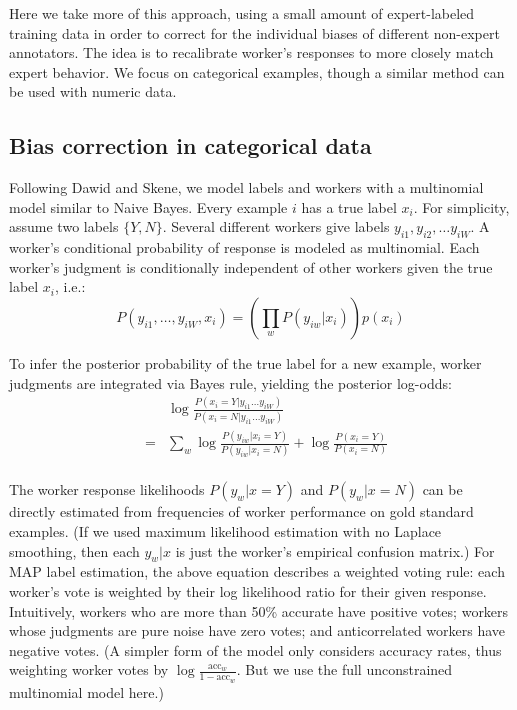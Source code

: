 \documentclass[11pt]{article}
\begin{document}
Here we take more of this approach, using a small amount of expert-labeled training data in order to correct for the individual biases of different non-expert annotators.  The idea is to recalibrate worker's responses to more closely match expert behavior.  We focus on categorical examples, though a similar method can be used with numeric data.
\vspace*{-0.1in}
\subsection{ Bias correction in categorical data }

Following Dawid and Skene, we model labels and workers with a multinomial model similar to Naive Bayes.
Every example $i$ has a true label $x_i$.  For simplicity, assume two labels $\{Y,N\}$.   Several different workers give labels $y_{i1}, y_{i2}, \ldots y_{iW}$.  A worker's conditional probability of response is modeled as multinomial.  Each worker's judgment is conditionally independent of other workers given the true label $x_i$, i.e.:
\[ P(y_{i1}, \ldots, y_{iW}, x_i) = \left( \prod_{w} P(y_{iw} | x_i) \right) p(x_i) \]

To infer the posterior probability of the true label for a new example, worker judgments are integrated via Bayes rule, yielding the posterior log-odds:
\begin{eqnarray*}
&& \log \frac{P(x_i = Y  | y_{i1} \ldots y_{iW}) }{ P(x_i=N | y_{i1} \ldots y_{iW})  }  \\
&=& \sum_w \log \frac{ P(y_{iw} | x_i = Y) }{ P(y_{iw} | x_i = N) } + \log \frac{P(x_i=Y)}{P(x_i=N)} \\
\end{eqnarray*}

The worker response likelihoods $P(y_w | x=Y)$ and $P(y_w | x=N)$ can be directly estimated from frequencies of worker performance on gold standard examples.  
(If we used maximum likelihood estimation with no Laplace smoothing, then each $y_w | x$ is just the worker's empirical confusion matrix.)  For MAP label estimation, the above equation describes a weighted voting rule: each worker's vote is weighted by their log likelihood ratio for their given response.  Intuitively, workers who are more than 50\% accurate have positive votes; workers whose judgments are pure noise have zero votes; and anticorrelated workers have negative votes.  (A simpler form of the model only considers accuracy rates, thus weighting worker votes by $\log \frac{\textrm{acc}_w}{1-\textrm{acc}_w}$.  But we use the full unconstrained multinomial model here.)
\end{document}
